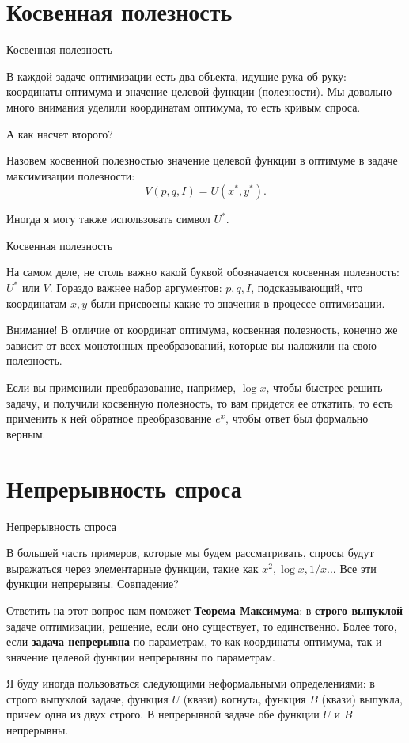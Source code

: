 \documentclass{beamer}
\begin{document}
\section{Косвенная полезность}

\begin{frame}{Косвенная полезность}

В каждой задаче оптимизации есть два объекта, идущие рука об руку: координаты оптимума и значение целевой функции (полезности). Мы довольно много внимания уделили координатам оптимума, то есть кривым спроса. 

А как насчет второго?

\begin{definition}
Назовем \alert{косвенной полезностью} значение целевой функции в оптимуме в задаче максимизации полезности:
$$ V(p,q,I) = U(x^{\ast}, y^{\ast}).$$
\end{definition}
Иногда я могу также использовать символ $U^{\ast}$.

\end{frame}

\begin{frame}{Косвенная полезность}

На самом деле, не столь важно какой буквой обозначается косвенная полезность: $U^{\ast}$ или $V$. Гораздо важнее набор аргументов: $p,q, I$, подсказывающий, что координатам $x,y$ были присвоены какие-то значения в процессе оптимизации.


Внимание! В отличие от координат оптимума, косвенная полезность, конечно же зависит от всех монотонных преобразований, которые вы наложили на свою полезность.

Если вы применили преобразование, например, $\log x$, чтобы быстрее решить задачу, и получили косвенную полезность, то вам придется ее откатить, то есть применить к ней обратное преобразование $e^x$, чтобы ответ был формально верным.

\end{frame}

\section{Непрерывность спроса}

\begin{frame}{Непрерывность спроса}

В большей часть примеров, которые мы будем рассматривать, спросы будут выражаться через элементарные функции, такие как $x^2, \log x, 1/x$... Все эти функции непрерывны. Совпадение?

Ответить на этот вопрос нам поможет \textbf{Теорема Максимума}: в \textbf{строго выпуклой} задаче оптимизации, решение, если оно существует, то единственно. Более того, если \textbf{задача непрерывна} по параметрам, то как координаты оптимума, так и значение целевой функции непрерывны по параметрам.

Я буду иногда пользоваться следующими неформальными определениями: в строго выпуклой задаче, функция $U$ (квази) вогнутa, функция $B$ (квази) выпукла, причем одна из двух строго. В непрерывной задаче обе функции $U$ и $B$ непрерывны.

\end{frame}
\end{document}
